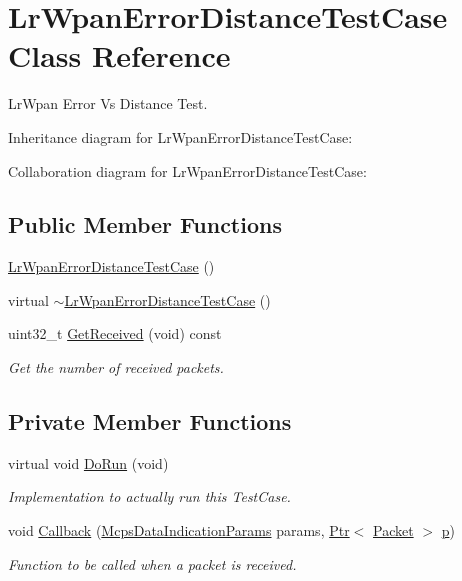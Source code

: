 \hypertarget{classLrWpanErrorDistanceTestCase}{}\section{Lr\+Wpan\+Error\+Distance\+Test\+Case Class Reference}
\label{classLrWpanErrorDistanceTestCase}


Lr\+Wpan Error Vs Distance Test.  




Inheritance diagram for Lr\+Wpan\+Error\+Distance\+Test\+Case\+:


Collaboration diagram for Lr\+Wpan\+Error\+Distance\+Test\+Case\+:
\subsection*{Public Member Functions}
\begin{DoxyCompactItemize}
\item 
\hyperlink{classLrWpanErrorDistanceTestCase_a21702f4e4fd4ba26895c17c90a9052d5}{Lr\+Wpan\+Error\+Distance\+Test\+Case} ()
\item 
virtual \hyperlink{classLrWpanErrorDistanceTestCase_a125658df549c6adf0c53395b37087d8b}{$\sim$\+Lr\+Wpan\+Error\+Distance\+Test\+Case} ()
\item 
uint32\+\_\+t \hyperlink{classLrWpanErrorDistanceTestCase_af16058b19d3686a1fa8684f26339f3be}{Get\+Received} (void) const 
\begin{DoxyCompactList}\small\item\em Get the number of received packets. \end{DoxyCompactList}\end{DoxyCompactItemize}
\subsection*{Private Member Functions}
\begin{DoxyCompactItemize}
\item 
virtual void \hyperlink{classLrWpanErrorDistanceTestCase_a4f63a2ed4dcf517ae2a593497774b254}{Do\+Run} (void)
\begin{DoxyCompactList}\small\item\em Implementation to actually run this Test\+Case. \end{DoxyCompactList}\item 
void \hyperlink{classLrWpanErrorDistanceTestCase_a0d940a7a4e02c258c1c9613b8b791907}{Callback} (\hyperlink{structns3_1_1McpsDataIndicationParams}{Mcps\+Data\+Indication\+Params} params, \hyperlink{classns3_1_1Ptr}{Ptr}$<$ \hyperlink{classns3_1_1Packet}{Packet} $>$ \hyperlink{lte__link__budget__x2__handover__measures_8m_ac9de518908a968428863f829398a4e62}{p})
\begin{DoxyCompactList}\small\item\em Function to be called when a packet is received. \end{DoxyCompactList}\end{DoxyCompactItemize}
